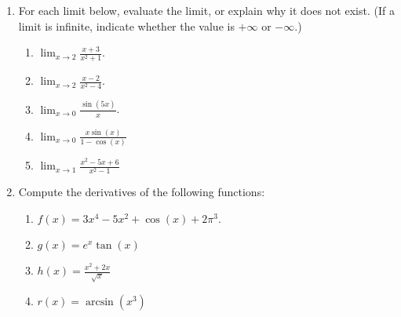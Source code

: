 \documentclass[12pt]{article}
\newcommand{\points}[1]{\marginpar{\hspace{24pt}[#1]}}
\newcommand{\di}{\displaystyle}
\begin{document}
\begin{enumerate}
\item For each limit below, evaluate the limit, or explain why it does not exist. (If a limit is infinite, indicate whether the value is $+\infty$ or $-\infty$.)
\begin{enumerate}
 \item $\di \lim_{x\to 2}\frac{x+3}{x^2+1}$. \points{2}

\vspace{1in}

 \item $\di \lim_{x\to 2}\frac{x-2}{x^2-4}$. \points{2}

\vspace{1in}

 \item $\di \lim_{x \to 0}\frac{\sin(5x)}{x}$. \points{2}

\vspace{1.5in}

 \item $\di \lim_{x \to 0}\frac{x\sin(x)}{1-\cos(x)}$ \points{2}

\vspace{1.5in}

 \item $\di \lim_{x\to 1}\frac{x^2-5x+6}{x^2-1}$ \points{2}

\end{enumerate}
\newpage

\item Compute the derivatives of the following functions:
\begin{enumerate}
 \item $\di f(x) = 3x^4-5x^2+\cos(x)+2\pi^3.$ \points{2}

\vspace{1.5in}

 \item $\di g(x) = e^x\tan(x)$ \points{3}

\vspace{1.75in}

 \item $\di h(x) = \frac{x^2+2x}{\sqrt{x}}$ \points{3}

\vspace{2.25in}

 \item $\di r(x) = \arcsin(x^3)$ \points{2}
\end{enumerate}

\end{enumerate}
\end{document}

